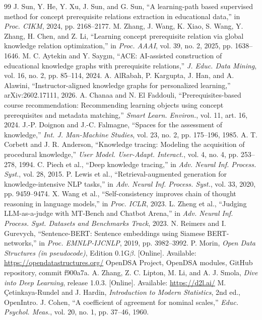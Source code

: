 \documentclass[conference]{IEEEtran}
\begin{document}
\begin{thebibliography}{99}
 J. Sun, Y. He, Y. Xu, J. Sun, and G. Sun, ``A learning-path based supervised method for concept prerequisite relations extraction in educational data,'' in \emph{Proc. CIKM}, 2024, pp. 2168--2177.
 M. Zhang, J. Wang, K. Xiao, S. Wang, Y. Zhang, H. Chen, and Z. Li, ``Learning concept prerequisite relation via global knowledge relation optimization,'' in \emph{Proc. AAAI}, vol. 39, no. 2, 2025, pp. 1638--1646.
 M. C. Aytekin and Y. Sayg{\i}n, ``ACE: AI-assisted construction of educational knowledge graphs with prerequisite relations,'' \emph{J. Educ. Data Mining}, vol. 16, no. 2, pp. 85--114, 2024.
 A. AlRabah, P. Kargupta, J. Han, and A. Alawini, ``Instructor-aligned knowledge graphs for personalized learning,'' arXiv:2602.17111, 2026.
 A. Chanaa and N. El Faddouli, ``Prerequisites-based course recommendation: Recommending learning objects using concept prerequisites and metadata matching,'' \emph{Smart Learn. Environ.}, vol. 11, art. 16, 2024.
 J.-P. Doignon and J.-C. Falmagne, ``Spaces for the assessment of knowledge,'' \emph{Int. J. Man-Machine Studies}, vol. 23, no. 2, pp. 175--196, 1985.
 A. T. Corbett and J. R. Anderson, ``Knowledge tracing: Modeling the acquisition of procedural knowledge,'' \emph{User Model. User-Adapt. Interact.}, vol. 4, no. 4, pp. 253--278, 1994.
 C. Piech et al., ``Deep knowledge tracing,'' in \emph{Adv. Neural Inf. Process. Syst.}, vol. 28, 2015.
 P. Lewis et al., ``Retrieval-augmented generation for knowledge-intensive NLP tasks,'' in \emph{Adv. Neural Inf. Process. Syst.}, vol. 33, 2020, pp. 9459--9474.
 X. Wang et al., ``Self-consistency improves chain of thought reasoning in language models,'' in \emph{Proc. ICLR}, 2023.
 L. Zheng et al., ``Judging LLM-as-a-judge with MT-Bench and Chatbot Arena,'' in \emph{Adv. Neural Inf. Process. Syst. Datasets and Benchmarks Track}, 2023.
 N. Reimers and I. Gurevych, ``Sentence-BERT: Sentence embeddings using Siamese BERT-networks,'' in \emph{Proc. EMNLP-IJCNLP}, 2019, pp. 3982--3992.
 P. Morin, \emph{Open Data Structures (in pseudocode)}, Edition 0.1G$\beta$. [Online]. Available: \url{https://opendatastructures.org/}
 OpenDSA Project, OpenDSA modules, GitHub repository, commit f900a7a.
 A. Zhang, Z. C. Lipton, M. Li, and A. J. Smola, \emph{Dive into Deep Learning}, release 1.0.3. [Online]. Available: \url{https://d2l.ai/}
 M. \c{C}etinkaya-Rundel and J. Hardin, \emph{Introduction to Modern Statistics}, 2nd ed., OpenIntro.
 J. Cohen, ``A coefficient of agreement for nominal scales,'' \emph{Educ. Psychol. Meas.}, vol. 20, no. 1, pp. 37--46, 1960.
\end{thebibliography}
\end{document}
